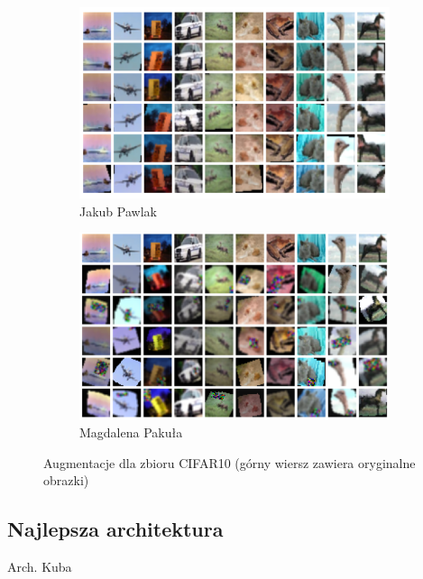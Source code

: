 \documentclass[10pt]{article}
\begin{document}
\begin{figure}[H]\centering
    \begin{subfigure}[t]{.45\textwidth}
        \centering
        \includegraphics[width=.7\linewidth]{img/kuba/cifar/augmentations.png}
        \caption{Jakub Pawlak}
    \end{subfigure}
    \begin{subfigure}[t]{.45\textwidth}
        \centering
        \includegraphics[width=.7\linewidth]{img/magda/augmented_CIFAR}
        \caption{Magdalena Pakuła}
    \end{subfigure}
    \caption{Augmentacje dla zbioru CIFAR10 (górny wiersz zawiera oryginalne obrazki)}
\end{figure}


\subsection*{Najlepsza architektura}

Arch. Kuba
\end{document}
